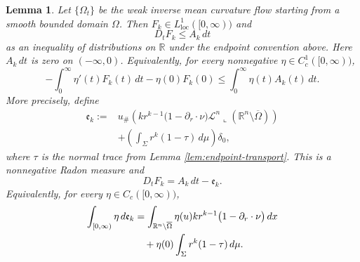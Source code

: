 \documentclass[10pt,a4paper]{amsart}
\numberwithin{equation}{section}
\newtheorem{lemma}[theorem]{Lemma}
\newcommand{\R}{\mathbb R}
\newcommand{\Om}{\Omega}
\newcommand{\Sig}{\Sigma}
\begin{document}
\begin{lemma}\label{lem:transport}
Let $\{\Om_t\}$ be the weak inverse mean curvature flow starting from a smooth bounded domain $\Om$.  Then $F_k\in L^1_{\mathrm{loc}}([0,\infty))$ and
\begin{equation*}
    D_tF_k\leq A_k\,dt
\end{equation*}
as an inequality of distributions on $\mathbb R$ under the endpoint convention above. Here $A_k\,dt$ is zero on $(-\infty,0)$.  Equivalently, for every nonnegative $\eta\in C_c^1([0,\infty))$,
\begin{equation}\label{eq:distribution-F}
    -\int_0^\infty\eta'(t)F_k(t)\,dt-\eta(0)F_k(0)
    \leq
    \int_0^\infty\eta(t)A_k(t)\,dt.
\end{equation}
More precisely, define
\begin{equation}\label{eq:Euclidean-defect-measure-definition}
\begin{split}
    \mathfrak e_k
    :=&{u}_{\#}\left(
      kr^{k-1}\bigl(1-\partial_r\cdot\nu\bigr)
      \mathcal L^n\mathbin{\llcorner}
      (\R^n\setminus\overline\Om)\right)\\
    &+
      \left(\int_\Sig r^k(1-\tau)\,d\mu\right)\delta_0,
\end{split}
\end{equation}
where $\tau$ is the normal trace from Lemma \ref{lem:endpoint-transport}.  This is a nonnegative Radon measure and
\begin{equation}\label{eq:F-defect-measure}
    D_tF_k=A_k\,dt-\mathfrak e_k.
\end{equation}
Equivalently, for every $\eta\in C_c([0,\infty))$,
\begin{align}
    \int_{[0,\infty)}\eta\,d\mathfrak e_k
    &=\int_{\R^n\setminus\overline\Om}
      \eta(u)kr^{k-1}\bigl(1-\partial_r\cdot\nu\bigr)\,dx \notag\\
    &\quad+\eta(0)\int_\Sig r^k(1-\tau)\,d\mu.\label{eq:Euclidean-defect}
\end{align}
\end{lemma}
\end{document}
